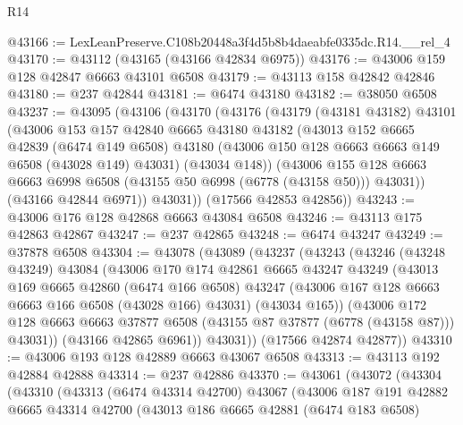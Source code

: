 \begin{lexlean}{R14}
\begin{coremodule}
@43166 := LexLeanPreserve.C108b20448a3f4d5b8b4daeabfe0335dc.R14.__rel_4
@43170 := @43112 (@43165 (@43166 @42834 @6975))
@43176 := @43006 @159 @128 @42847 @6663 @43101 @6508
@43179 := @43113 @158 @42842 @42846
@43180 := @237 @42844
@43181 := @6474 @43180
@43182 := @38050 @6508
@43237 := @43095
    (@43106
      (@43170
        (@43176
          (@43179
            (@43181 @43182)
            @43101
            (@43006
              @153
              @157
              @42840
              @6665
              @43180
              @43182
              (@43013
                @152
                @6665
                @42839
                (@6474 @149 @6508)
                @43180
                (@43006 @150 @128 @6663 @6663 @149 @6508 (@43028 @149) @43031)
                (@43034 @148))
              (@43006
                @155
                @128
                @6663
                @6663
                @6998
                @6508
                (@43155 @50 @6998 (@6778 (@43158 @50)))
                @43031))
            (@43166 @42844 @6971))
          @43031))
      (@17566 @42853 @42856))
@43243 := @43006 @176 @128 @42868 @6663 @43084 @6508
@43246 := @43113 @175 @42863 @42867
@43247 := @237 @42865
@43248 := @6474 @43247
@43249 := @37878 @6508
@43304 := @43078
    (@43089
      (@43237
        (@43243
          (@43246
            (@43248 @43249)
            @43084
            (@43006
              @170
              @174
              @42861
              @6665
              @43247
              @43249
              (@43013
                @169
                @6665
                @42860
                (@6474 @166 @6508)
                @43247
                (@43006 @167 @128 @6663 @6663 @166 @6508 (@43028 @166) @43031)
                (@43034 @165))
              (@43006
                @172
                @128
                @6663
                @6663
                @37877
                @6508
                (@43155 @87 @37877 (@6778 (@43158 @87)))
                @43031))
            (@43166 @42865 @6961))
          @43031))
      (@17566 @42874 @42877))
@43310 := @43006 @193 @128 @42889 @6663 @43067 @6508
@43313 := @43113 @192 @42884 @42888
@43314 := @237 @42886
@43370 := @43061
    (@43072
      (@43304
        (@43310
          (@43313
            (@6474 @43314 @42700)
            @43067
            (@43006
              @187
              @191
              @42882
              @6665
              @43314
              @42700
              (@43013
                @186
                @6665
                @42881
                (@6474 @183 @6508)

\end{coremodule}
\end{lexlean}
